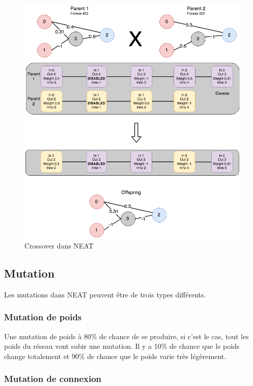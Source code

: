\documentclass{article}
\begin{document}
\begin{figure}[H]
\begin{center}
	\includegraphics[scale=0.5]{crossoverneat.png}
	\caption{Crossover dans NEAT}
\end{center}
\end{figure}

\subsection{Mutation}

Les mutations dans NEAT peuvent être de trois types différents.

\subsubsection{Mutation de poids}

Une mutation de poids à 80\% de chance de se produire, si c'est le cas, tout les poids du réseau vont subir une mutation. Il y a 10\% de chance que le poids change totalement et 90\% de chance que le poids varie très légèrement.

\subsubsection{Mutation de connexion}
\end{document}
